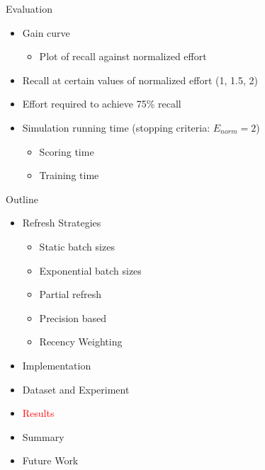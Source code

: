 \documentclass[14pt]{beamer}
\newcommand{\red}[1]{\textcolor{red}{#1}}
\begin{document}
\begin{frame}{Evaluation}
    \begin{itemize}
        \item Gain curve
            \begin{itemize}
                \item Plot of recall against normalized effort
            \end{itemize}
        \pause
        \item Recall at certain values of normalized effort (1, 1.5, 2)
        \item Effort required to achieve 75\% recall
        \pause
        \item Simulation running time (stopping criteria: $E_{norm} = 2$)
            \begin{itemize}
                \item Scoring time
                \item Training time
            \end{itemize}
    \end{itemize}
\end{frame}


\begin{frame}{Outline}
\begin{itemize}
    \item Refresh Strategies
    \begin{itemize}
        \item Static batch sizes
        \item Exponential batch sizes
        \item Partial refresh
        \item Precision based
        \item Recency Weighting
    \end{itemize}
    \item Implementation
    \item Dataset and Experiment
    \item \red{Results}
    \item Summary
    \item Future Work
\end{itemize}
\end{frame}
\end{document}
